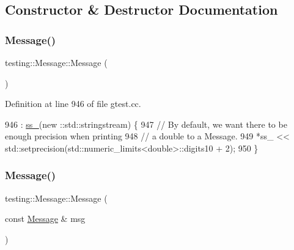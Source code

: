\subsection{Constructor \& Destructor Documentation}
\mbox{\label{classtesting_1_1Message_af5ba7216630df9845f18feb64b1a5383}} 
\subsubsection{\texorpdfstring{Message()}{Message()}\hspace{0.1cm}{\footnotesize\ttfamily [1/3]}}
{\footnotesize\ttfamily testing\+::\+Message\+::\+Message (\begin{DoxyParamCaption}{ }\end{DoxyParamCaption})}



Definition at line 946 of file gtest.\+cc.


\begin{DoxyCode}
946                  : \hyperlink{classtesting_1_1Message_ad46fbddd62cde8526744ae32e3322b76}{ss\_}(new ::std::stringstream) \{
947   \textcolor{comment}{// By default, we want there to be enough precision when printing}
948   \textcolor{comment}{// a double to a Message.}
949   *ss\_ << std::setprecision(std::numeric\_limits<double>::digits10 + 2);
950 \}
\end{DoxyCode}
\mbox{\label{classtesting_1_1Message_ac126e24804817a053bebba0920d94a11}} 
\subsubsection{\texorpdfstring{Message()}{Message()}\hspace{0.1cm}{\footnotesize\ttfamily [2/3]}}
{\footnotesize\ttfamily testing\+::\+Message\+::\+Message (\begin{DoxyParamCaption}\item[{const \hyperlink{classtesting_1_1Message}{Message} \&}]{msg }\end{DoxyParamCaption})\hspace{0.3cm}{\ttfamily [inline]}}



